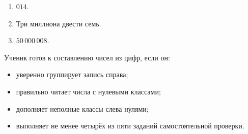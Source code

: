 \begin{checkpointbox}
  \begin{enumerate}
    \item \(014\).
    \item Три миллиона двести семь.
    \item \(50\,000\,008\).
  \end{enumerate}
\end{checkpointbox}

\begin{teacherbox}
  Ученик готов к составлению чисел из цифр, если он:
  \begin{itemize}
    \item уверенно группирует запись справа;
    \item правильно читает числа с нулевыми классами;
    \item дополняет неполные классы слева нулями;
    \item выполняет не менее четырёх из пяти заданий самостоятельной проверки.
  \end{itemize}
\end{teacherbox}
